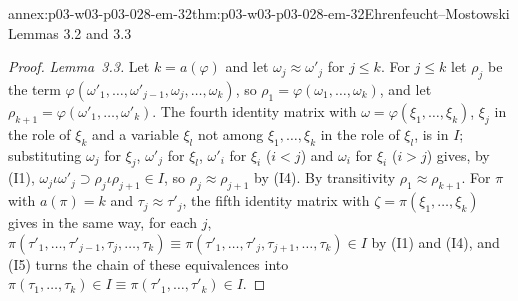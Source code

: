 \begin{annexitem}{annex:p03-w03-p03-028-em-32}{thm:p03-w03-p03-028-em-32}{Ehrenfeucht--Mostowski Lemmas 3.2 and 3.3}
\begin{proof}
\emph{Lemma~3.3.}  Let \(k=a(\varphi)\) and let \(\omega_j\approx\omega'_j\)
for \(j\leq k\).  For \(j\leq k\) let \(\rho_j\) be the term
\(\varphi(\omega'_1,\ldots,\omega'_{j-1},\omega_j,\ldots,\omega_k)\), so
\(\rho_1=\varphi(\omega_1,\ldots,\omega_k)\), and let
\(\rho_{k+1}=\varphi(\omega'_1,\ldots,\omega'_k)\).  The fourth identity
matrix with \(\omega=\varphi(\xi_1,\ldots,\xi_k)\), \(\xi_j\) in the role of
\(\xi_k\) and a variable \(\xi_l\) not among \(\xi_1,\ldots,\xi_k\) in the role of
\(\xi_l\), is in \(I\); substituting \(\omega_j\) for \(\xi_j\), \(\omega'_j\) for
\(\xi_l\), \(\omega'_i\) for \(\xi_i\) (\(i<j\)) and \(\omega_i\) for \(\xi_i\)
(\(i>j\)) gives, by (I1), \(\omega_j\iota\omega'_j\supset\rho_j\iota\rho_{j+1}\in
I\), so \(\rho_j\approx\rho_{j+1}\) by (I4).  By transitivity
\(\rho_1\approx\rho_{k+1}\).  For \(\pi\) with \(a(\pi)=k\) and
\(\tau_j\approx\tau'_j\), the fifth identity matrix with
\(\zeta=\pi(\xi_1,\ldots,\xi_k)\) gives in the same way, for each \(j\),
\(\pi(\tau'_1,\ldots,\tau'_{j-1},\tau_j,\ldots,\tau_k)\equiv
\pi(\tau'_1,\ldots,\tau'_j,\tau_{j+1},\ldots,\tau_k)\in I\) by (I1) and (I4), and
(I5) turns the chain of these equivalences into
\(\pi(\tau_1,\ldots,\tau_k)\in I\equiv\pi(\tau'_1,\ldots,\tau'_k)\in I\).
\end{proof}
\end{annexitem}

